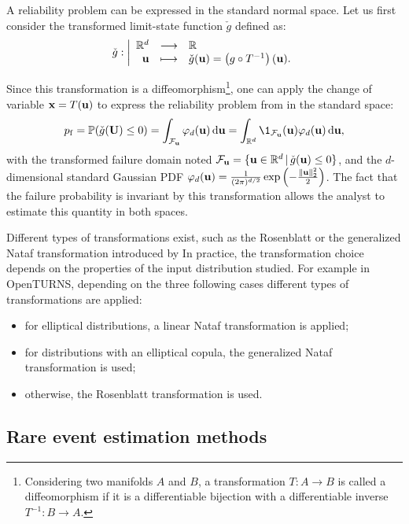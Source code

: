 A reliability problem can be expressed in the standard normal space. 
Let us first consider the transformed limit-state function $\check{g}$ defined as: 
\begin{equation}
    \check{g} : \bigg|
    \begin{array}{rcl}
        \mathbb{R}^d & \longrightarrow & \mathbb{R}\\
        {\bf u} & \longmapsto & \check{g}({\bf u}) = \left(g \circ T^{-1}\right)({\bf u}).
    \end{array}
\end{equation}

Since this transformation is a diffeomorphism\footnote{Considering two manifolds $A$ and $B$, a transformation $T: A \rightarrow B$ is called a diffeomorphism if it is a differentiable bijection with a differentiable inverse $T^{-1} : B \rightarrow A$.}, 
one can apply the change of variable ${\bf x} = T({\bf u})$ to express the reliability problem from  in the standard space: 
\begin{equation}
    \pf = \P(\cg(\bU) \leq 0) 
        = \int_{\iF_\bu} \varphi_d(\bu) \, \dd\bu 
        = \int_{\R^d} \1_{\iF_\bu}(\bu) \varphi_d(\bu) \, \dd\bu,
\end{equation}
with the transformed failure domain noted $\mathcal{F}_{\bf u} = \{{\bf u} \in \mathbb{R}^d \, | \, \check{g}({\bf u}) \leq 0\}$, 
and the $d$-dimensional standard Gaussian PDF $\varphi_d({\bf u}) = \frac{1}{(2\pi)^{d/2}} \exp\left(-\frac{\lVert{\bf u}\rVert^2_2}{2}\right)$. 
The fact that the failure probability is invariant by this transformation allows the analyst to estimate this quantity in both spaces.  

Different types of transformations exist, such as the Rosenblatt or the generalized Nataf transformation introduced by \citet{Lebrun_PHD_2013}
In practice, the transformation choice depends on the properties of the input distribution studied. 
For example in OpenTURNS, depending on the three following cases different types of transformations are applied:
\begin{itemize}
    \item for elliptical distributions, a linear Nataf transformation is applied;
    \item for distributions with an elliptical copula, the generalized Nataf transformation is used;
    \item otherwise, the Rosenblatt transformation is used.
\end{itemize}  


\subsection{Rare event estimation methods}

